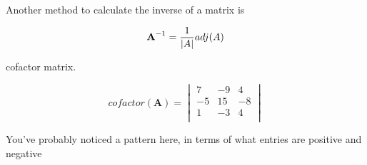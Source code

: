 \documentclass[
]{book}
\begin{document}
Another method to calculate the inverse of a matrix is

\[\textbf{A}^{-1}={{1}\over{|A|}}adj(A)\]

cofactor matrix.

\[
cofactor(\textbf{A})=\begin{vmatrix}
7&-9&4\\
-5&15&-8\\
1&-3&4\\
\end{vmatrix}
\]

You've probably noticed a pattern here, in terms of what entries are
positive and negative

  
\end{document}
